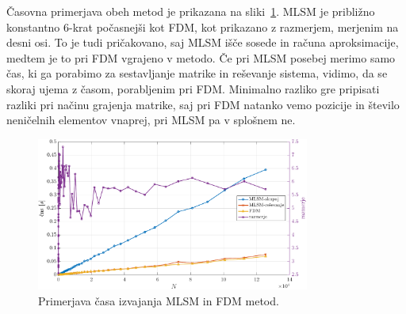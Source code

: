 \documentclass[12pt,a4paper]{article}
\theoremstyle{definition} %
\theoremstyle{plain} %
\numberwithin{equation}{section}
\begin{document}
Časovna primerjava obeh metod je prikazana na sliki~\ref{fig:mlsm-fdm-time}.
MLSM je približno konstantno 6-krat počasnejši kot FDM, kot prikazano z
razmerjem, merjenim na desni osi. To je tudi pričakovano, saj MLSM išče
sosede in računa aproksimacije, medtem je to pri FDM vgrajeno v metodo.
Če pri MLSM posebej merimo samo čas, ki ga
porabimo za sestavljanje matrike in reševanje sistema, vidimo, da se skoraj
ujema z časom, porabljenim pri FDM. Minimalno razliko gre pripisati razliki pri
načinu grajenja matrike, saj pri FDM natanko vemo pozicije in število neničelnih
elementov vnaprej, pri MLSM pa v splošnem ne.

\begin{figure}[h]
  \centering
  \includegraphics[width=0.8\textwidth]{images/lap1d_times.pdf}
  \caption{Primerjava časa izvajanja MLSM in FDM metod.}
  \label{fig:mlsm-fdm-time}
\end{figure}
\end{document}
